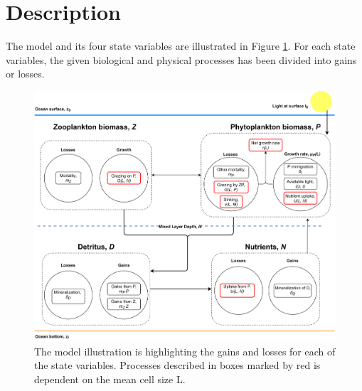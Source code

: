 \section{Description}
The model and its four state variables are illustrated in Figure \cref{fig:ModelIllust}. For each state variables, the given biological and physical processes has been divided into gains or losses.  
\begin{figure}[H]
\centering
\includegraphics[width=.90\linewidth]{Figures/ModelIllustration_HighRes1.png}
\caption{The model illustration is highlighting the gains and losses for each of the state variables. Processes described in boxes marked by red is dependent on the mean cell size L.}
\label{fig:ModelIllust}
\end{figure}
\newpage
%
